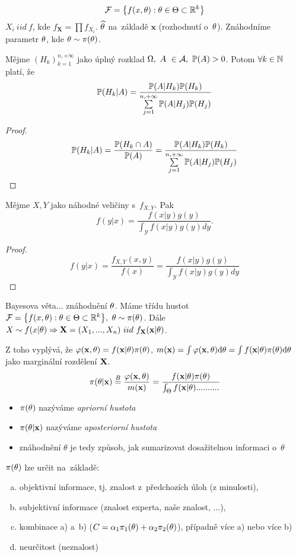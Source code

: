 $$ \mathcal{F}=\big\{ f(x,\theta):\theta\in\Theta\subset\mathbb{R}^k \big\} $$
$X_i~iid~f$, kde $f_\textbf{X}=\prod f_{X_i}$. $\widehat{\theta}$ na~základě $\textbf{x}$ (rozhodnutí o~$\theta$). Znáhodníme parametr $\theta$, kde $\theta\sim\pi(\theta)$.
\begin{theorem}[Bayesova] 
	Mějme $(H_k)_{k=1}^{n,+\infty}$ jako úplný rozklad $\Omega,~A~\in \mathcal{A} , ~\mathbb{P}(A)>0$. Potom $\forall k\in\mathbb{N}$ platí, že 
	\[
	\mathbb{P}(H_k|A)=\frac{\mathbb{P}(A|H_k)\mathbb{P}(H_k)}{\sum\limits_{j=1}^{n,+\infty}\mathbb{P}(A|H_j)\mathbb{P}(H_j)}
	\]
	\begin{proof}
		$$\mathbb{P}(H_k|A)=\frac{\mathbb{P}(H_k\cap A)}{\mathbb{P}(A)}=\frac{\mathbb{P}(A|H_k)\mathbb{P}(H_k)}{\sum\limits_{j=1}^{n,+\infty}\mathbb{P}(A|H_j)\mathbb{P}(H_j)}$$
	\end{proof}
\end{theorem}
\begin{theorem}
	Mějme $X,Y$ jako náhodné veličiny s~$f_{X,Y}$. Pak
	$$ f(y|x)=\frac{f(x|y)g(y)}{\int_{\mathcal{Y}}f(x|y)g(y)dy}. $$
\begin{proof}
$$ f(y|x)=\frac{f_{X,Y}(x,y)}{f(x)}=\frac{f(x|y)g(y)}{\int_{\mathcal{Y}}f(x|y)g(y)dy} $$
\end{proof}

\end{theorem}
\begin{remark}
	Bayesova věta... znáhodnění $\theta$. Máme třídu hustot $\mathcal{F}=\big\{f(x,\theta):\theta\in\Theta\subset\mathbb{R}^k\big\},~\theta\sim\pi(\theta)$. Dále $X\sim f(x|\theta)\Rightarrow \textbf{X}=(X_1,...,X_n)~iid~f_{\textbf{X}}(\textbf{x}|\theta)$.
	
	Z toho vyplývá, že $\varphi(\textbf{x},\theta)=f(\textbf{x}|\theta)\pi(\theta)$, $m(\textbf{x})=\int\varphi(\textbf{x},\theta)\mathrm{d} \theta=\int f(\textbf{x}|\theta)\pi(\theta)\mathrm{d}\theta$ jako marginální rozdělení $\textbf{X}$. 
	$$ \pi(\theta|\textbf{x})\stackrel{B}{=}\frac{\varphi(\textbf{x},\theta)}{m(\textbf{x})}=\frac{f(\textbf{x}|\theta)\pi(\theta)}{\int_\Theta f(\textbf{x}|\theta)..........} $$
	\begin{itemize}
	\item 	$\pi(\theta)$ nazýváme \textit{apriorní hustota}
	\item   $\pi(\theta|\textbf{x})$ nazýváme \textit{aposteriorní hustota}
	\item znáhodnění $\theta$ je tedy způsob, jak sumarizovat dosažitelnou informaci o~$\theta$
	\end{itemize}


	
\end{remark}


$\pi(\theta)$ lze určit na~základě:\begin{enumerate}[a)]
	\item objektivní informace, tj. znalost z~předchozích úloh (z minulosti),
	\item subjektivní informace (znalost experta, naše znalost, ...),
	\item kombinace a) a~b) ($C=\alpha_1\pi_1(\theta)+\alpha_2\pi_2(\theta)$), případně více a) nebo více b)
	\item neurčitost (neznalost)
\end{enumerate}

